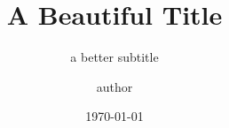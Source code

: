 \usepackage[spanish]{babel}



\title{A Beautiful Title}
\subtitle{a better subtitle}
\author[piratax007]{author}

\date{\today{}}


